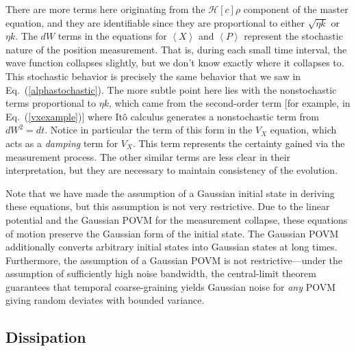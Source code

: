 \documentclass[12pt,aps,onecolum,superscriptaddress,footinbib,floatfix,showpacs]{revtex4-1}
\def\expct#1{\!\left\langle{#1}\right\rangle}
\def\Vx{V_X}
\begin{document}
There are more terms here originating from the $\mathcal{H}[c]\rho$ component
of the master equation, and they are identifiable since they
are proportional to either $\sqrt{\eta k}$ or $\eta k$.  
The $dW$ terms in the equations for $\expct{X}$ and $\expct{P}$ represent
the stochastic nature of the position measurement.  That is, during each
small time interval, the wave function collapses slightly, but we don't know 
exactly where it collapses to.  This stochastic behavior is
precisely the same behavior that we saw in Eq.~(\ref{alphastochastic}).
The more subtle point here lies with the nonstochastic terms proportional
to $\eta k$, which came from the second-order term [for example,
in Eq.~(\ref{vxexample})] where It\^o calculus generates a 
nonstochastic term from $dW^2=dt$.  Notice in particular the term of
this form in the $\Vx$ equation, which acts as a \textit{damping} term
for $\Vx$.  This term represents the certainty gained via the measurement
process.  The other similar terms are less clear in their interpretation,
but they are necessary to maintain consistency
of the evolution.

Note that we have made the assumption of a Gaussian initial state
in deriving these equations, but this assumption is not very restrictive.
Due to the linear potential and the Gaussian POVM for the measurement
collapse, these equations of motion preserve the Gaussian form of the initial
state.  The Gaussian POVM additionally converts arbitrary initial states into 
Gaussian states at long times.
Furthermore, the assumption of a Gaussian POVM is not 
restrictive---under the assumption of sufficiently high noise bandwidth,
the central-limit theorem guarantees that temporal
coarse-graining yields Gaussian noise for \textit{any} 
POVM giving random deviates with bounded variance.



\subsection{Dissipation}
\end{document}
